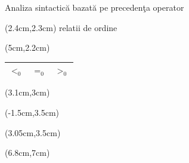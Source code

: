 \documentclass[pdf]{beamer}
\begin{document}
\begin{frame}{Analiza sintactică bazată pe precedenţa operator}
 
\begin{textblock*}{11cm}(2.4cm,2.3cm)
 relatii de ordine
\end{textblock*}
 
\begin{textblock*}{11cm}(5cm,2.2cm)
 \begin{tabular}{| c | c | c |}
  \hline
  $<_{0}$ & $=_{0}$ & $>_{0}$\\
  \hline
 \end{tabular}
\end{textblock*}

 \begin{textblock*}{11cm}(3.1cm,3cm)
\end{textblock*}
    
\begin{textblock*}{11cm}(-1.5cm,3.5cm)
    \begin{center}
\end{center}
\end{textblock*}

\begin{textblock*}{11cm}(3.05cm,3.5cm)
 \begin{center}
\end{center}
\end{textblock*}

\begin{textblock*}{11cm}(6.8cm,7cm)
\end{textblock*}


\end{frame}
\end{document}
